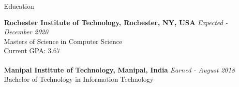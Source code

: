 \documentclass{resume} %
\begin{document}

\begin{rSection}{Education}

{\bf Rochester Institute of Technology, Rochester, NY, USA} \hfill {\em Expected - December 2020} 
\\ Masters of Science in Computer Science
\\ Current GPA: 3.67
\\
\\{\bf Manipal Institute of Technology, Manipal, India             } \hfill {\em Earned - August 2018} 
\\ Bachelor of Technology in Information Technology
\end{rSection}
\end{document}
